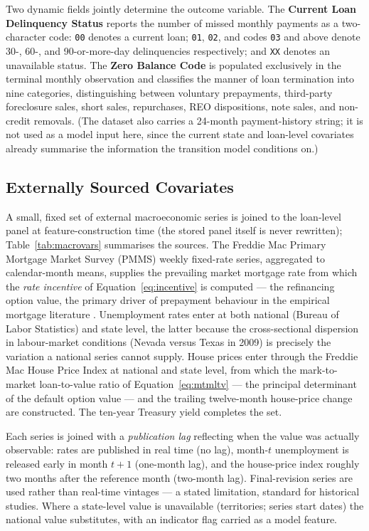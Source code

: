 Two dynamic fields jointly determine the outcome variable.  The
\textbf{Current Loan Delinquency Status} reports the number of missed
monthly payments as a two-character code: \texttt{00} denotes a
current loan; \texttt{01}, \texttt{02}, and codes \texttt{03} and
above denote 30-, 60-, and 90-or-more-day delinquencies respectively;
and \texttt{XX} denotes an unavailable status.  The \textbf{Zero
Balance Code} is populated exclusively in the terminal monthly
observation and classifies the manner of loan termination into nine
categories, distinguishing between voluntary prepayments, third-party
foreclosure sales, short sales, repurchases, REO dispositions, note
sales, and non-credit removals.  (The dataset also carries a 24-month
payment-history string; it is not used as a model input here, since
the current state and loan-level covariates already summarise the
information the transition model conditions on.)

\subsection{Externally Sourced Covariates}
\label{subsec:data-external}

A small, fixed set of external macroeconomic series is joined to the
loan-level panel at feature-construction time (the stored panel
itself is never rewritten); Table~\ref{tab:macrovars} summarises the
sources.  The Freddie Mac Primary Mortgage Market Survey (PMMS)
weekly fixed-rate series, aggregated to calendar-month means, supplies
the prevailing market mortgage rate from which the \emph{rate
incentive} of Equation~\eqref{eq:incentive} is computed --- the
refinancing option value, the primary driver of prepayment behaviour
in the empirical mortgage literature
\citep{schwartz1989,sirignano2021}.  Unemployment rates enter at both
national (Bureau of Labor Statistics) and state level, the latter
because the cross-sectional dispersion in labour-market conditions
(Nevada versus Texas in 2009) is precisely the variation a national
series cannot supply.  House prices enter through the Freddie Mac
House Price Index at national and state level, from which the
mark-to-market loan-to-value ratio of Equation~\eqref{eq:mtmltv} ---
the principal determinant of the default option value
\citep{deng2000} --- and the trailing twelve-month house-price change
are constructed.  The ten-year Treasury yield completes the set.

Each series is joined with a \emph{publication lag} reflecting when
the value was actually observable: rates are published in real time
(no lag), month-$t$ unemployment is released early in month $t{+}1$
(one-month lag), and the house-price index roughly two months after
the reference month (two-month lag).  Final-revision series are used
rather than real-time vintages --- a stated limitation, standard for
historical studies.  Where a state-level value is unavailable
(territories; series start dates) the national value substitutes,
with an indicator flag carried as a model feature.

